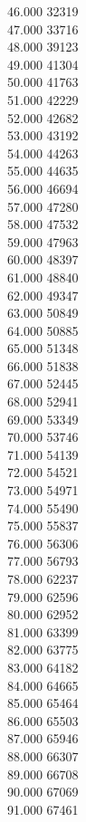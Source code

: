 { 46.000	32319 \\
 47.000	33716 \\
 48.000	39123 \\
 49.000	41304 \\
 50.000	41763 \\
 51.000	42229 \\
 52.000	42682 \\
 53.000	43192 \\
 54.000	44263 \\
 55.000	44635 \\
 56.000	46694 \\
 57.000	47280 \\
 58.000	47532 \\
 59.000	47963 \\
 60.000	48397 \\
 61.000	48840 \\
 62.000	49347 \\
 63.000	50849 \\
 64.000	50885 \\
 65.000	51348 \\
 66.000	51838 \\
 67.000	52445 \\
 68.000	52941 \\
 69.000	53349 \\
 70.000	53746 \\
 71.000	54139 \\
 72.000	54521 \\
 73.000	54971 \\
 74.000	55490 \\
 75.000	55837 \\
 76.000	56306 \\
 77.000	56793 \\
 78.000	62237 \\
 79.000	62596 \\
 80.000	62952 \\
 81.000	63399 \\
 82.000	63775 \\
 83.000	64182 \\
 84.000	64665 \\
 85.000	65464 \\
 86.000	65503 \\
 87.000	65946 \\
 88.000	66307 \\
 89.000	66708 \\
 90.000	67069 \\
 91.000	67461 \\
}
